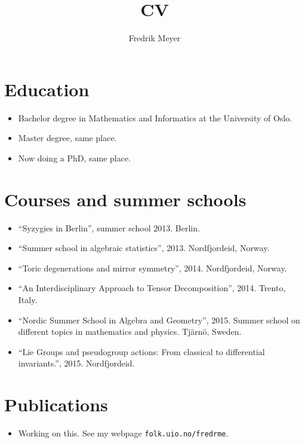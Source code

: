 \documentclass[11pt, english]{article}
\begin{document}
\title{CV}
\author{Fredrik Meyer}
\maketitle 

\section{Education}

\begin{itemize}
\item Bachelor degree in Mathematics and Informatics at the University of Oslo.
\item Master degree, same place.
\item Now doing a PhD, same place.
\end{itemize}

\section{Courses and summer schools}

\begin{itemize}
\item ``Syzygies in Berlin'', summer school 2013. Berlin.
\item ``Summer school in algebraic statistics'', 2013. Nordfjordeid, Norway.
\item ``Toric degenerations and mirror symmetry'', 2014. Nordfjordeid, Norway.
\item ``An Interdisciplinary Approach to Tensor Decomposition'', 2014. Trento, Italy.
\item ``Nordic Summer School in Algebra and Geometry'', 2015. Summer school on different topics in mathematics and physics. Tjärnö, Sweden.
\item ``Lie Groups and pseudogroup actions: From classical to differential invariants.'', 2015. Nordfjordeid.
\end{itemize}

\section{Publications}

\begin{itemize}
\item Working on this. See my webpage \verb|folk.uio.no/fredrme|. 
\end{itemize}
\end{document}
